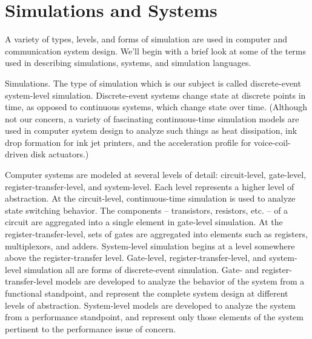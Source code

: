 \setcounter{chapter}{1}
\setcounter{section}{0}
\label{chap:introduction}
\section{Simulations and Systems}
\label{sec:simulations-and-systems}

A variety of types, levels, and forms of simulation are used in computer and
communication system design. We'll begin with a brief look at some of the terms
used in describing simulations, systems, and simulation languages.

Simulations. The type of simulation which is our subject is called
discrete-event system-level simulation. Discrete-event systems change state at
discrete points in time, as opposed to continuous systems, which change state
over time. (Although not our concern, a variety of fascinating continuous-time
simulation models are used in computer system design to analyze such things as
heat dissipation, ink drop formation for ink jet printers, and the acceleration
profile for voice-coil-driven disk actuators.)

Computer systems are modeled at several levels of detail: circuit-level,
gate-level, register-transfer-level, and system-level. Each level represents a
higher level of abstraction. At the circuit-level, continuous-time simulation is
used to analyze state switching behavior. The components -- transistors,
resistors, etc. -- of a circuit are aggregated into a single element in
gate-level simulation. At the register-transfer-level, sets of gates are
aggregated into elements such as registers, multiplexors, and adders.
System-level simulation begins at a level somewhere above the register-transfer
level. Gate-level, register-transfer-level, and system-level simulation all are
forms of discrete-event simulation. Gate- and register-transfer-level models
are developed to analyze the behavior of the system from a functional
standpoint, and represent the complete system design at different levels of
abstraction. System-level models are developed to analyze the system from a
performance standpoint, and represent only those elements of the system
pertinent to the performance issue of concern.

